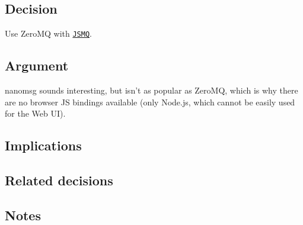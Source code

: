 \subsection*{Decision}

Use Zero\+M\+Q with \href{https://github.com/zeromq/JSMQ}{\tt J\+S\+M\+Q}.

\subsection*{Argument}

nanomsg sounds interesting, but isn't as popular as Zero\+M\+Q, which is why there are no browser J\+S bindings available (only Node.\+js, which cannot be easily used for the Web U\+I).

\subsection*{Implications}

\subsection*{Related decisions}

\subsection*{Notes}